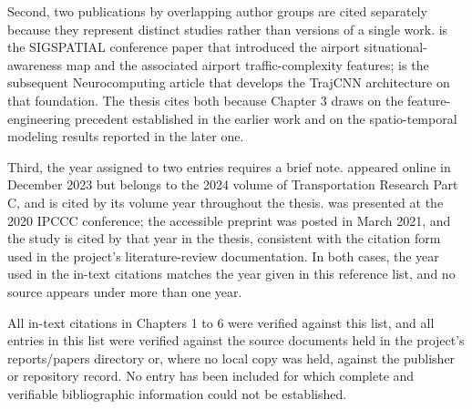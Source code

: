 Second, two publications by overlapping author groups are cited separately because they represent distinct studies rather than versions of a single work. \textcite{shao2019flight} is the SIGSPATIAL conference paper that introduced the airport situational-awareness map and the associated airport traffic-complexity features; \textcite{shao2022predicting} is the subsequent Neurocomputing article that develops the TrajCNN architecture on that foundation. The thesis cites both because Chapter 3 draws on the feature-engineering precedent established in the earlier work and on the spatio-temporal modeling results reported in the later one.

Third, the year assigned to two entries requires a brief note. \textcite{pang2024machine} appeared online in December 2023 but belongs to the 2024 volume of Transportation Research Part C, and is cited by its volume year throughout the thesis. \textcite{zhang2021spatiotemporal} was presented at the 2020 IPCCC conference; the accessible preprint was posted in March 2021, and the study is cited by that year in the thesis, consistent with the citation form used in the project’s literature-review documentation. In both cases, the year used in the in-text citations matches the year given in this reference list, and no source appears under more than one year.

All in-text citations in Chapters 1 to 6 were verified against this list, and all entries in this list were verified against the source documents held in the project’s reports/papers directory or, where no local copy was held, against the publisher or repository record. No entry has been included for which complete and verifiable bibliographic information could not be established.
